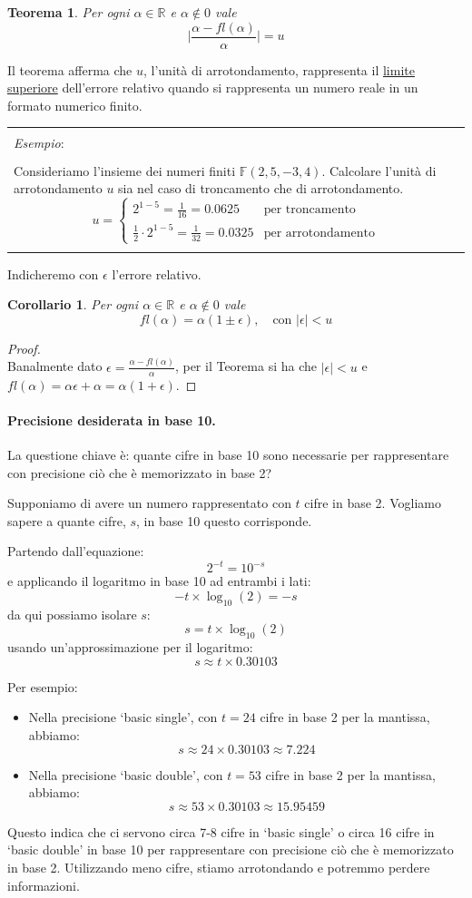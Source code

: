 \documentclass{article}
\newtheorem*{theorem}{\color{green}\textbf{Teorema}}
\newtheorem*{corollary}{\color{violet}\textbf{Corollario}}
\numberwithin{equation}{section}
\newenvironment{example}
{\begin{center}
        \begin{tabular}{|p{0.9\textwidth}|}
            \hline \\ 
            \textit{Esempio}: \\\\ 
        }
        {
            \\\\ \hline
        \end{tabular}
    \end{center}
}
\begin{document}
\begin{theorem}
   Per ogni $\alpha\in \mathbb{R}$ e $\alpha\notin0$ vale
   $$\Big\lvert \frac{\alpha-fl(\alpha)}{\alpha}\Big\rvert=u$$
\end{theorem}
Il teorema afferma che $u$, l'unità di arrotondamento, rappresenta il
\underline{limite superiore} dell'errore relativo quando si rappresenta 
un numero reale in un formato numerico finito.
\begin{example}
    Consideriamo l'insieme dei numeri finiti $\mathbb{F}(2,5,-3,4)$. Calcolare l'unità di arrotondamento $u$ sia nel caso di troncamento che di
    arrotondamento.
    $$u=\begin{cases}
        2^{1-5}=\frac{1}{16}=0.0625 & \text{per
        troncamento} \\
        \frac{1}{2}\cdot2^{1-5}=\frac{1}{32}=0.0325 & \text{per arrotondamento}
    \end{cases}$$
\end{example}
Indicheremo con $\epsilon$ l'errore relativo.
\begin{corollary}
    Per ogni $\alpha\in \mathbb{R}$ e $\alpha\notin0$ vale 
    $$  fl(\alpha)=\alpha(1\pm\epsilon),\quad \text{con }\lvert 
      \epsilon\rvert<u $$
\end{corollary} 
\begin{proof}\leavevmode\\
    Banalmente dato $\epsilon=\frac{\alpha-fl(\alpha)}{\alpha}$,
    per il Teorema si ha che $\lvert \epsilon\rvert<u$ e
    $fl(\alpha)=\alpha\epsilon+\alpha=\alpha(1+\epsilon)$.
\end{proof}
\paragraph{Precisione desiderata in base 10.}
La questione chiave è: quante cifre in base 10 sono necessarie per
rappresentare con precisione ciò che è memorizzato in base 2? 

Supponiamo di avere un numero rappresentato con $t$ cifre in base 2. Vogliamo
sapere a quante cifre, $s$, in base 10 questo corrisponde.

Partendo dall'equazione:
$$2^{-t}=10^{-s}$$
e applicando il logaritmo in base 10 ad entrambi i lati:
$$-t\times\log_{10}(2)=-s$$
da qui possiamo isolare $s$:
$$s=t\times\log_{10}(2)$$
usando un'approssimazione per il logaritmo:
$$s \approx t \times 0.30103$$

Per esempio:
\begin{itemize}
\item Nella precisione `basic single', con \( t = 24 \) cifre in base 2 per la mantissa, abbiamo:
$$s \approx 24 \times 0.30103 \approx 7.224$$
\item Nella precisione `basic double', con \( t = 53 \) cifre in base 2 per la mantissa, abbiamo:
$$s \approx 53 \times 0.30103 \approx 15.95459$$
\end{itemize}
Questo indica che ci servono circa 7-8 cifre in `basic single' o circa 16
cifre in `basic double' in base 10 per rappresentare con
precisione ciò che è memorizzato in base 2. Utilizzando meno cifre, stiamo
arrotondando e potremmo perdere informazioni.
\end{document}

